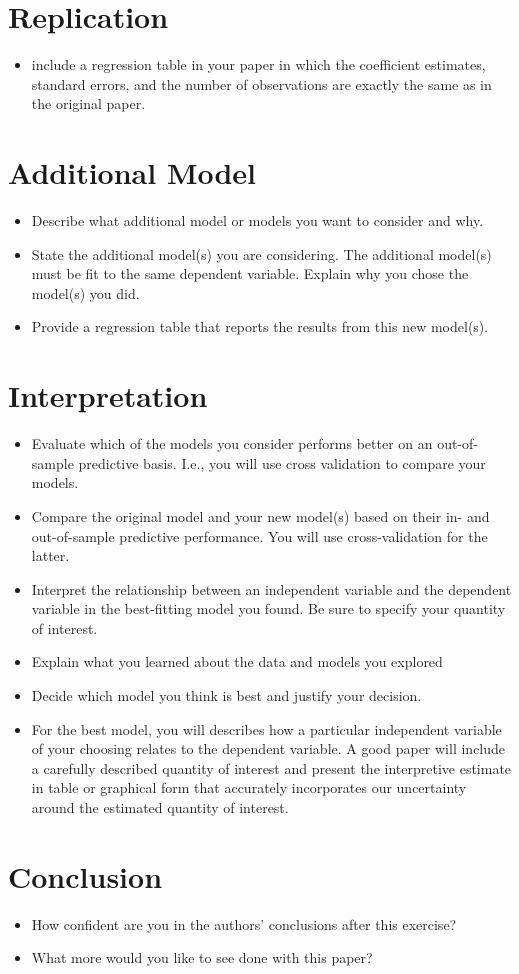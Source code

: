 \documentclass{article}
\begin{document}
\section{Replication}
\begin{itemize}
    \item include a regression table in your paper in which the coefficient estimates, standard errors, and the number of observations are exactly the same as in the original paper.
\end{itemize}

\section{Additional Model}
\begin{itemize}
\item Describe what additional model or models you want to consider and why.
\item State the additional model(s) you are considering.  The additional model(s) must be fit to the same dependent variable.  Explain why you chose the model(s) you did.
\item Provide a regression table that reports the results from this new model(s).
\end{itemize}

\section{Interpretation}
\begin{itemize}
\item Evaluate which of the models you consider performs better on an out-of-sample predictive basis.  I.e., you will use cross validation to compare your models. 
\item Compare the original model and your new model(s) based on their in- and out-of-sample predictive performance. You will use cross-validation for the latter.
\item Interpret the relationship between an independent variable and the dependent variable in the best-fitting model you found.  Be sure to specify your quantity of interest.
\item Explain what you learned about the data and models you explored 
\item Decide which model you think is best and justify your decision.
\item For the best model, you will describes how a particular independent variable of your choosing relates to the dependent variable.  A good paper will include a carefully described quantity of interest and present the interpretive estimate in table or graphical form that accurately incorporates our uncertainty around the estimated quantity of interest. 
\end{itemize}

\section{Conclusion}
\begin{itemize}
    \item How confident are you in the authors’ conclusions after this exercise? 
    \item What more would you like to see done with this paper?
\end{itemize}
\end{document}
